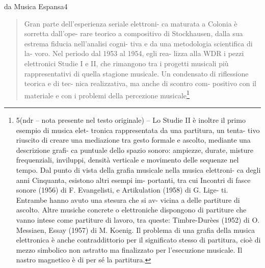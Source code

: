 da Musica Espansa4

\begin{quote}

Gran parte dell’esperienza seriale elettroni- ca maturata a Colonia è sorretta dall’ope- rare teorico a compositivo di Stockhausen, dalla sua estrema fiducia nell’analisi cogni- tiva e da una metodologia scientifica di la- voro. Nel periodo dal 1953 al 1954, egli rea- lizza alla WDR i pezzi elettronici Studie I e II, che rimangono tra i progetti musicali più rappresentativi di quella stagione musicale. Un condensato di riflessione teorica e di tec- nica realizzativa, ma anche di scontro com- positivo con il materiale e con i problemi della percezione musicale\footnote{5(ndr – nota presente nel testo originale) – Lo Studie II è inoltre il primo esempio di musica elet- tronica rappresentata da una partitura, un tenta- tivo riuscito di creare una mediazione tra gesto formale e ascolto, mediante una descrizione grafi- ca puntuale dello spazio sonoro: ampiezze, durate, misture frequenziali, inviluppi, densità verticale e movimento delle sequenze nel tempo. Dal punto di vista della grafia musicale nella musica elettroni- ca degli anni Cinquanta, esistono altri esempi im- portanti, tra cui Incontri di fasce sonore (1956) di F. Evangelisti, e Artikulation (1958) di G. Lige- ti. Entrambe hanno avuto una stesura che si av- vicina a delle partiture di ascolto. Altre musiche concrete o elettroniche dispongono di partiture che vanno intese come partiture di lavoro, tra queste: Timbre-Durèes (1952) di O. Messiaen, Essay (1957) di M. Koenig. Il problema di una grafia della musica elettronica è anche contraddittorio per il significato stesso di partitura, cioè di mezzo simbolico non astratto ma finalizzato per l’esecuzione musicale. Il nastro magnetico è di per sé la partitura.}


\end{quote}

